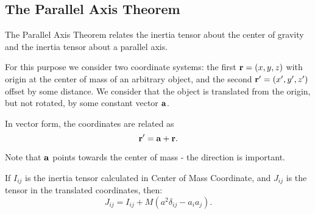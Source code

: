 \subsection{The Parallel Axis Theorem}

The Parallel Axis Theorem relates the inertia  tensor about the center of gravity and the inertia tensor about a parallel axis.

For this purpose we consider two coordinate systems: the first $\mathbf{ r} = (x,y,z)$ with origin at the center of mass of an arbitrary object, and the second $\mathbf{ r'} = (x',y',z')$ offset by some distance. We consider that the object is translated from the origin, but not rotated, by some constant vector $\mathbf{ a}$.

In vector form, the coordinates are related as
\[\mathbf{ r'} = \mathbf{ a} + \mathbf{ r}.\]

Note that $\mathbf{ a}$ points towards the center of mass - the direction is important.
\begin{theorem}
If $I_{ij}$ is the inertia tensor calculated in Center of Mass Coordinate, and $J_{ij}$ is the tensor in the translated coordinates, then:
\[J_{ij} = I_{ij} + M(a^2 \delta_{ij} - a_i a_j). \]
\end{theorem}


